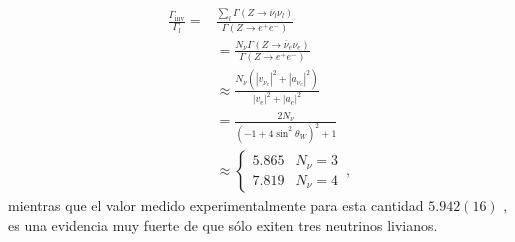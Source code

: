\begin{align}
  \frac{\Gamma_{\text{inv}}}{\Gamma_l}=&\frac{\sum_l\Gamma(Z\to\bar{\nu}_l\nu_l)}{\Gamma(Z\to e^+ e^-)}\nonumber\\
  &=\frac{N_\nu\Gamma(Z\to\bar{\nu}_e\nu_e)}{\Gamma(Z\to e^+ e^-)}\nonumber\\
  &\approx\frac{N_\nu(|v_{\nu_e}|^2+|a_{\nu_e}|^2)}{|v_{e}|^2+|a_{e}|^2}\nonumber\\
  &=\frac{2N_\nu}{(-1+4\sin^2\theta_W)^2+1}\nonumber\\
  &\approx\begin{cases}
    5.865&N_\nu=3\\
    7.819&N_\nu=4
  \end{cases}\,,
\end{align}
mientras que el valor medido experimentalmente para esta cantidad $5.942(16)$ \cite{a}, es una evidencia muy fuerte de que s\'olo exiten tres neutrinos livianos. 

